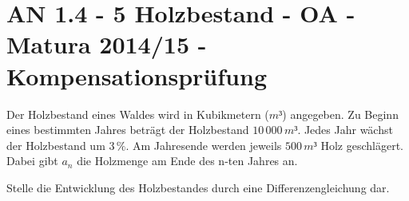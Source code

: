 \section{AN 1.4 - 5 Holzbestand - OA - Matura 2014/15 - Kompensationsprüfung}

\begin{beispiel}[AN 1.4]{1} %
				Der Holzbestand eines Waldes wird in Kubikmetern ($m³$) angegeben. Zu Beginn eines bestimmten Jahres beträgt der Holzbestand $10\,000\,m³$. Jedes Jahr wächst der Holzbestand um $3\,\%$. Am Jahresende werden jeweils $500\,m³$ Holz geschlägert. Dabei gibt $a_{n}$ die Holzmenge am Ende des n-ten Jahres an.
				
				Stelle die Entwicklung des Holzbestandes durch eine Differenzengleichung dar.\\
				
\end{beispiel}